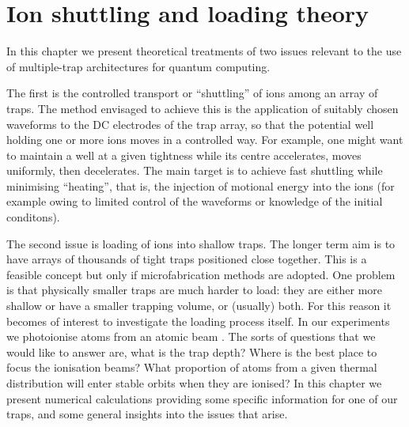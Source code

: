 \setcounter{chapter}{2} %
\chapter{Ion shuttling and loading theory}
\label{chapter:waveforms}


In this chapter we present theoretical treatments of two issues relevant to the use of multiple-trap architectures for quantum computing. 

The first is the controlled transport or ``shuttling'' of ions among an array of traps. The method envisaged to achieve this is the application of suitably chosen waveforms to the DC electrodes of the trap array, so that the potential well holding one or more ions moves in a controlled way. For example, one might want to maintain a well at a given tightness while its centre accelerates, moves uniformly, then decelerates.
The main target is to achieve fast shuttling while minimising ``heating'', that is, the injection of motional energy into the ions (for example owing to limited control of the waveforms or knowledge of the initial conditons). 

The second issue is loading of ions into shallow traps. The longer term aim  is to have arrays of thousands of tight traps positioned close together. 
This is a feasible concept but only if microfabrication methods are adopted. One problem is that physically smaller traps are much harder to load: they are either more shallow or have a smaller trapping volume, or (usually) both. For this reason it becomes of interest to investigate the loading process itself. 
In our experiments we photoionise atoms from an atomic beam \cite{Lucas2004}. The sorts of questions that we would like to answer  are, what is the trap depth? Where is the best place to focus the ionisation beams?  What proportion of atoms from a given thermal distribution will enter stable orbits  when they are ionised? In this chapter
we present numerical calculations providing some specific information for one of our traps, and some general insights into the issues that arise. 

